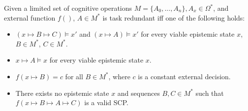 \begin{lemma} \label{lem:taskredundant}
Given a limited set of cognitive operations $M=\{A_0, ..., A_n\}, A_x \in \Omega^*$, and external function $f()$, $A \in M^*$ is task redundant iff one of the following holds:
\begin{itemize}
\item $(x \longmapsto B \longmapsto C) \models x'$ and $(x \longmapsto A) \models x'$ for every viable epistemic state $x$, $B \in M^*$, $C \in M^*$. 
\item $x \longmapsto A \models x$ for every viable epistemic state $x$.
\item $f(x \longmapsto B)=c$ for all $B \in M^*$, where $c$ is a constant external decision.
\item There exists no epistemic state $x$ and sequences $B, C \in M^*$ such that $f(x \longmapsto B \longmapsto A \longmapsto C)$ is a valid SCP.
\end{itemize}
\end{lemma}

